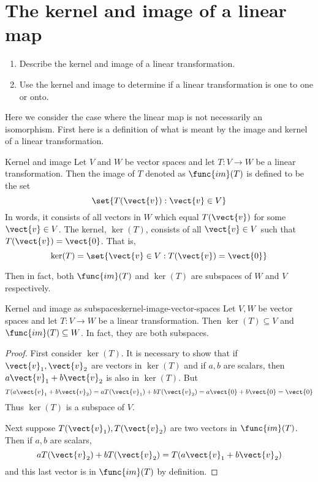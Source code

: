 \section{The kernel and image of a linear map}

\begin{outcome}
  \begin{enumerate}
  \item Describe the kernel and image of a linear transformation.
  \item Use the kernel and image to determine if a linear
    transformation is one to one or onto.
  \end{enumerate}
\end{outcome}

Here we consider the case where the linear map is not necessarily an
isomorphism. First here is a definition of what is meant by the image and
kernel of a linear transformation.

\begin{definition}{Kernel and image}{}
Let $V$ and $W$ be vector spaces and let $T:V\rightarrow W$ be a linear transformation. Then the image of $T$
denoted as $\func{im}(T) $ is defined to be the set 
\begin{equation*}
\set{T(\vect{v}):\vect{v}\in V}
\end{equation*}
In words, it consists of all vectors in $W$ which equal $T(\vect{v})$ for some $
\vect{v}\in V$. The kernel, $\ker (T)$, 
consists of all $\vect{v}\in V$ such that $T(\vect{v})=\vect{0}$. That is, 
\begin{equation*}
\ker (T) =\set{\vect{v}\in V:T(\vect{v})=\vect{0}}
\end{equation*}
\end{definition}

Then in fact, both $\func{im}(T) $ and $\ker (T) $
are subspaces of $W$ and $V$ respectively.

\begin{proposition}{Kernel and image as subspaces}{kernel-image-vector-spaces}
Let $V,W$ be vector spaces and let $T:V\rightarrow W$ be a linear transformation. Then $\ker (
T) \subseteq V$ and $\func{im}(T) \subseteq W$. In fact, they are both subspaces. 
\end{proposition}

\begin{proof}
First consider $\ker (T)$. It is necessary to
show that if $\vect{v}_{1},\vect{v}_{2}$ are vectors in $\ker (T) $
and if $a,b$ are scalars, then $a\vect{v}_{1}+b\vect{v}_{2}$ is also in $\ker
(T)$. But 
\begin{equation*}
T(a\vect{v}_{1}+b\vect{v}_{2}) =aT(\vect{v}_{1})+bT(\vect{v}_{2})=a\vect{0}+b\vect{0}=\vect{0}
\end{equation*}
Thus $\ker (T) $ is a subspace of $V$.

Next suppose $T(\vect{v}_{1}),T(\vect{v}_{2})$ are two vectors in $\func{im}(
T)$. Then if $a,b$ are scalars, 
\begin{equation*}
aT(\vect{v}_{2})+bT(\vect{v}_{2})=T(a\vect{v}_{1}+b\vect{v}_{2})
\end{equation*}
and this last vector is in $\func{im}(T) $ by definition. 
\end{proof}

